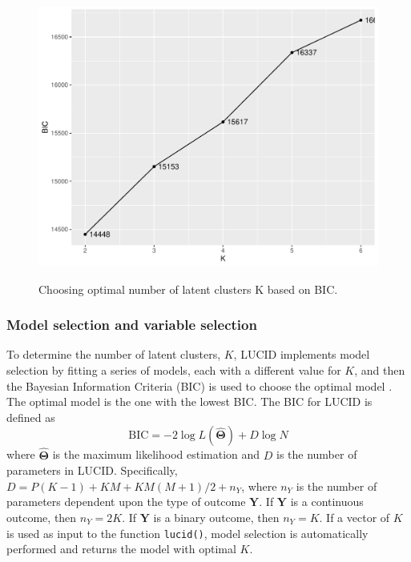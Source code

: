 \begin{figure}

{\centering \includegraphics[width=1\linewidth,alt={graphic without alt text}]{figures/fig4} 

}

\caption{Choosing optimal number of latent clusters K based on BIC.}\label{fig:fig4}
\end{figure}

\subsubsection{Model selection and variable selection}\label{sec3.3}

To determine the number of latent clusters, \(K\), LUCID implements model
selection by fitting a series of models, each with a different value for
\(K\), and then the Bayesian Information Criteria (BIC) is used to choose
the optimal model \citep{fan2013tuning}. The optimal model is the one with
the lowest BIC. The BIC for LUCID is defined as
\[\text{BIC} = -2 \log L(\hat{\boldsymbol{\mathbf{\Theta}}}) + D \log N\]
where \(\hat{\boldsymbol{\mathbf{\Theta}}}\) is the maximum likelihood
estimation and \(D\) is the number of parameters in LUCID. Specifically,
\(D = P(K - 1) + KM + KM(M + 1)/2 + n_Y\), where \(n_Y\) is the number of
parameters dependent upon the type of outcome \(\boldsymbol{\mathbf{Y}}\).
If \(\boldsymbol{\mathbf{Y}}\) is a continuous outcome, then \(n_Y = 2K\).
If \(\boldsymbol{\mathbf{Y}}\) is a binary outcome, then \(n_Y = K\). If a
vector of \(K\) is used as input to the function \texttt{lucid()}, model
selection is automatically performed and returns the model with optimal
\(K\).

